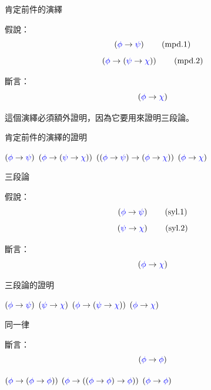 \documentclass{Slideshow}
\begin{document}
\begin{frame}{肯定前件的演繹}
    \begin{theorem}
        假說：
        \[ \wi\wph\wps          \tag{mpd.1} \]
        \[ \wi\wph{\wi\wps\wch} \tag{mpd.2} \]

        斷言：
        \[ \wi\wph\wch \]
    \end{theorem}

    這個演繹必須額外證明，因為它要用來證明三段論。
\end{frame}

\begin{frame}{肯定前件的演繹的證明}
    \begin{mmproof}{2em}{3em}
            $\wi\wph\wps$
            \label{mpd:1}
            $\wi\wph{\wi\wps\wch}$
            \label{mpd:2}
            $\aIIi\wph\wps\wch$
            \label{mpd:3}
            $\wi\wph\wch$
    \end{mmproof}
\end{frame}

\begin{frame}{三段論}
    \begin{theorem}
        假說：
        \[ \wi\wph\wps \tag{syl.1} \]
        \[ \wi\wps\wch \tag{syl.2} \]

        斷言：
        \[ \wi\wph\wch \]
    \end{theorem}
\end{frame}

\begin{frame}{三段論的證明}
    \begin{mmproof}{2em}{3em}
            $\wi\wph\wps$
            \label{syl:1}
            $\wi\wps\wch$
            \label{syl:2}
            $\wi\wph{\wi\wps\wch}$
            \label{syl:3}
            $\wi\wph\wch$
    \end{mmproof}
\end{frame}

\begin{frame}{同一律}
    \begin{theorem}[\mmurl{id}]
        斷言：
        \[ \wi\wph\wph \]

        \begin{mmproof}{2em}{3em}
                $\axI\wph\wph$
                \label{id:1}
                $\axI\wph{\wi\wph\wph}$
                \label{id:2}
                $\wi\wph\wph$
        \end{mmproof}
    \end{theorem}
\end{frame}
\end{document}
